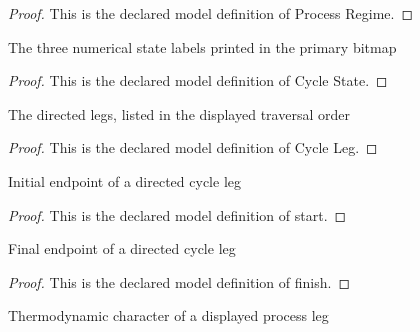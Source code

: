 \begin{proof}
  This is the declared model definition of Process Regime.
\end{proof}
\begin{definition}
  \label{def:physics:phyx-mini-0433:phyxminiproblems-problemphyxmini0433-cyclestate}
  The three numerical state labels printed in the primary bitmap
\end{definition}
\begin{proof}
  This is the declared model definition of Cycle State.
\end{proof}
\begin{definition}
  \label{def:physics:phyx-mini-0433:phyxminiproblems-problemphyxmini0433-cycleleg}
  The directed legs, listed in the displayed traversal order
\end{definition}
\begin{proof}
  This is the declared model definition of Cycle Leg.
\end{proof}
\begin{definition}[start]
  \label{def:physics:phyx-mini-0433:phyxminiproblems-problemphyxmini0433-cycleleg-start}
  Initial endpoint of a directed cycle leg
\end{definition}
\begin{proof}
  This is the declared model definition of start.
\end{proof}
\begin{definition}[finish]
  \label{def:physics:phyx-mini-0433:phyxminiproblems-problemphyxmini0433-cycleleg-finish}
  Final endpoint of a directed cycle leg
\end{definition}
\begin{proof}
  This is the declared model definition of finish.
\end{proof}
\begin{definition}
  \label{def:physics:phyx-mini-0433:phyxminiproblems-problemphyxmini0433-processkind}
  Thermodynamic character of a displayed process leg
\end{definition}

